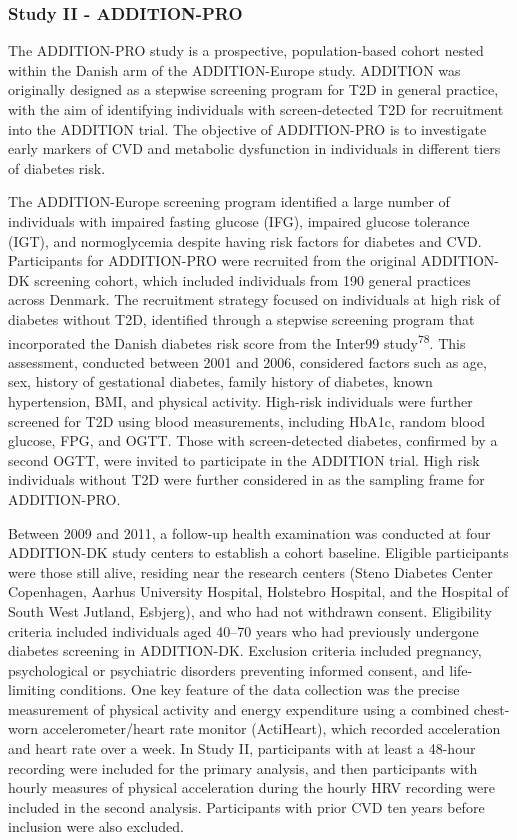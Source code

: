 \documentclass[
  a4paper,
  headsepline=true,
  open=any]{scrbook}
\begin{document}
\hypertarget{study-ii---addition-pro}{%
\subsubsection{Study II - ADDITION-PRO}\label{study-ii---addition-pro}}

The ADDITION-PRO study is a prospective, population-based cohort nested
within the Danish arm of the ADDITION-Europe study. ADDITION was
originally designed as a stepwise screening program for T2D in general
practice, with the aim of identifying individuals with screen-detected
T2D for recruitment into the ADDITION trial. The objective of
ADDITION-PRO is to investigate early markers of CVD and metabolic
dysfunction in individuals in different tiers of diabetes risk.

The ADDITION-Europe screening program identified a large number of
individuals with impaired fasting glucose (IFG), impaired glucose
tolerance (IGT), and normoglycemia despite having risk factors for
diabetes and CVD. Participants for ADDITION-PRO were recruited from the
original ADDITION-DK screening cohort, which included individuals from
190 general practices across Denmark. The recruitment strategy focused
on individuals at high risk of diabetes without T2D, identified through
a stepwise screening program that incorporated the Danish diabetes risk
score from the Inter99 study\textsuperscript{78}. This assessment,
conducted between 2001 and 2006, considered factors such as age, sex,
history of gestational diabetes, family history of diabetes, known
hypertension, BMI, and physical activity. High-risk individuals were
further screened for T2D using blood measurements, including HbA1c,
random blood glucose, FPG, and OGTT. Those with screen-detected
diabetes, confirmed by a second OGTT, were invited to participate in the
ADDITION trial. High risk individuals without T2D were further
considered in as the sampling frame for ADDITION-PRO.

Between 2009 and 2011, a follow-up health examination was conducted at
four ADDITION-DK study centers to establish a cohort baseline. Eligible
participants were those still alive, residing near the research centers
(Steno Diabetes Center Copenhagen, Aarhus University Hospital, Holstebro
Hospital, and the Hospital of South West Jutland, Esbjerg), and who had
not withdrawn consent. Eligibility criteria included individuals aged
40--70 years who had previously undergone diabetes screening in
ADDITION-DK. Exclusion criteria included pregnancy, psychological or
psychiatric disorders preventing informed consent, and life-limiting
conditions. One key feature of the data collection was the precise
measurement of physical activity and energy expenditure using a combined
chest-worn accelerometer/heart rate monitor (ActiHeart), which recorded
acceleration and heart rate over a week. In Study II, participants with
at least a 48-hour recording were included for the primary analysis, and
then participants with hourly measures of physical acceleration during
the hourly HRV recording were included in the second analysis.
Participants with prior CVD ten years before inclusion were also
excluded.
\end{document}
